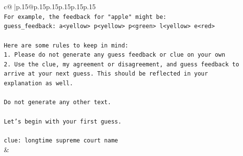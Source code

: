 \documentclass{article}
\begin{document}
{\begin{supertabular}{c@{$\;$}|p{.15\linewidth}@{}p{.15\linewidth}p{.15\linewidth}p{.15\linewidth}p{.15\linewidth}p{.15\linewidth}}
{{{\\ 
\texttt{For example, the feedback for "apple" might be:} \\
\texttt{guess\_feedback: a<yellow> p<yellow> p<green> l<yellow> e<red>} \\
\\ 
\texttt{Here are some rules to keep in mind:} \\
\texttt{1. Please do not generate any guess feedback or clue on your own} \\
\texttt{2. Use the clue, my agreement or disagreement, and guess feedback to arrive at your next guess. This should be reflected in your explanation as well.} \\
\\ 
\texttt{Do not generate any other text.} \\
\\ 
\texttt{Let's begin with your first guess.} \\
\\ 
\texttt{clue: longtime supreme court name} \\
            }
        }
    }
    & \\ \\


\end{supertabular}}
\end{document}
